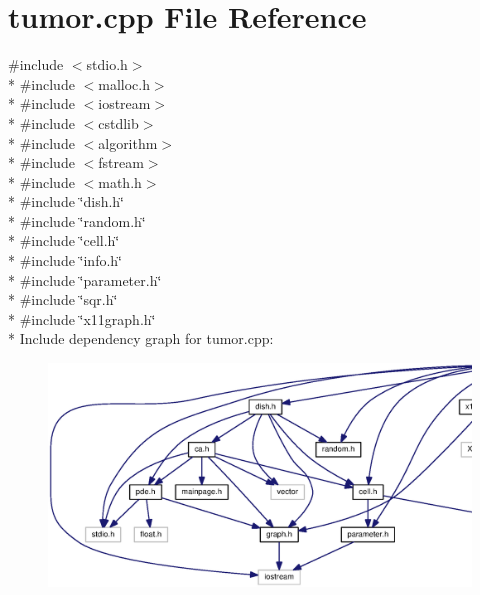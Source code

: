\section{tumor.\-cpp File Reference}
\label{tumor_8cpp}
{\ttfamily \#include $<$stdio.\-h$>$}\\*
{\ttfamily \#include $<$malloc.\-h$>$}\\*
{\ttfamily \#include $<$iostream$>$}\\*
{\ttfamily \#include $<$cstdlib$>$}\\*
{\ttfamily \#include $<$algorithm$>$}\\*
{\ttfamily \#include $<$fstream$>$}\\*
{\ttfamily \#include $<$math.\-h$>$}\\*
{\ttfamily \#include \char`\"{}dish.\-h\char`\"{}}\\*
{\ttfamily \#include \char`\"{}random.\-h\char`\"{}}\\*
{\ttfamily \#include \char`\"{}cell.\-h\char`\"{}}\\*
{\ttfamily \#include \char`\"{}info.\-h\char`\"{}}\\*
{\ttfamily \#include \char`\"{}parameter.\-h\char`\"{}}\\*
{\ttfamily \#include \char`\"{}sqr.\-h\char`\"{}}\\*
{\ttfamily \#include \char`\"{}x11graph.\-h\char`\"{}}\\*
Include dependency graph for tumor.\-cpp\-:
\nopagebreak
\begin{figure}[H]
\begin{center}
\leavevmode
\includegraphics[width=350pt]{tumor_8cpp__incl}
\end{center}
\end{figure}
